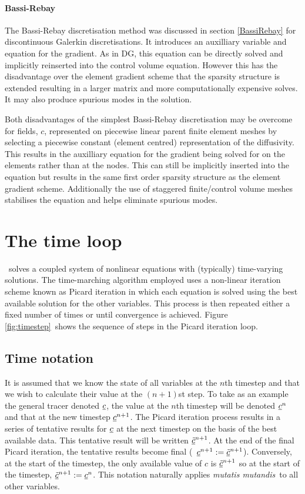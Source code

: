 \paragraph{Bassi-Rebay} \label{sec:cvbrdiff}

The Bassi-Rebay discretisation \citep{bassi1997} method was discussed in section \ref{BassiRebay} for discontinuous Galerkin discretisations.  It introduces an auxilliary variable and equation for the gradient.  As in DG, this equation can be directly solved and implicitly reinserted into the control volume equation.  However this has the disadvantage over the element gradient scheme that the sparsity structure is extended resulting in a larger matrix and more computationally expensive solves.  It may also produce spurious modes in the solution.

Both disadvantages of the simplest Bassi-Rebay discretisation may be overcome for fields, $c$, represented on piecewise linear parent finite element meshes by selecting a piecewise constant (element centred) representation of the diffusivity.  This results in the auxilliary equation for the gradient being solved for on the elements rather than at the nodes.  This can still be implicitly inserted into the equation but results in the same first order sparsity structure as the element gradient scheme.  Additionally the use of staggered finite/control volume meshes stabilises the equation and helps eliminate spurious modes.

\section{The time loop}
\label{sect:ND_time_loop}

\fluidity\ solves a coupled system of nonlinear equations with (typically)
time-varying solutions. The time-marching algorithm employed uses a
non-linear iteration scheme known as Picard iteration in which each equation
is solved using the best available solution for the other variables. This
process is then repeated either a fixed number of times or until convergence
is achieved. Figure \ref{fig:timestep}\ shows the sequence of steps in the
Picard iteration loop.

\subsection{Time notation}

It is assumed that we know the state of all variables at the $n$th timestep
and that we wish to calculate their value at the $(n+1)$st step. To take as an
example the general tracer denoted $\underline{c}$, the value at the $n$th
timestep will be denoted $\underline{c}^{n}$ and that at the new timestep
$\underline{c}^{n+1}$. The Picard iteration process results in a series of
tentative results for $\underline{c}$ at the next timestep on the basis of the
best available data. This tentative result will be written $\underline{\tilde c}^{n+1}$. At the
end of the final Picard iteration, the tentative results become final (\ie\
$\underline{c}^{n+1}:=\underline{\tilde c}^{n+1}$). Conversely, at the start of the timestep, the only
available value of $c$ is $\underline{\tilde c}^{n+1}$ so at the start of the timestep,
$\underline{\tilde c}^{n+1}:=\underline{c}^{n}$. This notation naturally applies \emph{mutatis mutandis}\ to
all other variables.

